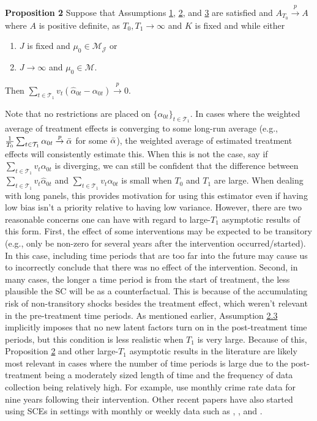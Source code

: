 \documentclass{article}
\begin{document}
\textbf{Proposition 2}\label{P2} Suppose that Assumptions \hyperref[A1]{1}, \hyperref[A2]{2}, and \hyperref[A3]{3} are satisfied and $A_{T_0} \overset{p}{\rightarrow} A$ where $A$ is positive definite, as $T_0 , T_1 \rightarrow \infty$ and $K$ is fixed and while either 
\begin{enumerate}[label=(\roman*)]
    \item $J$ is fixed and $\mu_0 \in \mathcal{M}_{\mathcal{J}}$ or
    \item $J \rightarrow \infty$ and $\mu_0 \in \mathcal{M}$.
\end{enumerate}
Then $ \sum_{t \in \mathcal{T}_1} v_t (\hat{\alpha}_{0t} - \alpha_{0t}) \overset{p}{\rightarrow} 0$.
\par
Note that no restrictions are placed on $\{ \alpha_{0t} \}_{t \in \mathcal{T}_1}$. In cases where the weighted average of treatment effects is converging to some long-run average (e.g., $\frac{1}{T_0}\sum_{t \in \mathcal{T}_1}\alpha_{0t} \overset{p}{\rightarrow} \Bar{\alpha}$ for some $\Bar{\alpha}$), the weighted average of estimated treatment effects will consistently estimate this. When this is not the case, say if $\sum_{t \in \mathcal{T}_1}v_t \alpha_{0t}$ is diverging, we can still be confident that the difference between $\sum_{t \in \mathcal{T}_1}v_t \hat{\alpha}_{0t}$ and $\sum_{t \in \mathcal{T}_1} v_t \alpha_{0t}$ is small when $T_0$ and $T_1$ are large. When dealing with long panels, this provides motivation for using this estimator even if having low bias isn't a priority relative to having low variance. However, there are two reasonable concerns one can have with regard to large-$T_1$ asymptotic results of this form. First, the effect of some interventions may be expected to be transitory (e.g., only be non-zero for several years after the intervention occurred/started). In this case, including time periods that are too far into the future may cause us to incorrectly conclude that there was no effect of the intervention. Second, in many cases, the longer a time period is from the start of treatment, the less plausible the SC will be as a counterfactual. This is because of the accumulating risk of non-transitory shocks besides the treatment effect, which weren't relevant in the pre-treatment time periods. As mentioned earlier, Assumption \hyperref[A2]{2.3} implicitly imposes that no new latent factors turn on in the post-treatment time periods, but this condition is less realistic when $T_1$ is very large. Because of this, Proposition \hyperref[A2]{2} and other large-$T_1$ asymptotic results in the literature are likely most relevant in cases where the number of time periods is large due to the post-treatment being a moderately sized length of time and the frequency of data collection being relatively high. For example, \cite{Carl2021} use monthly crime rate data for nine years following their intervention. Other recent papers have also started using SCEs in settings with monthly or weekly data such as \cite{GibsonSun2023}, \cite{ClarkeEtAl2023}, and \cite{Li2020}. 
\end{document}
